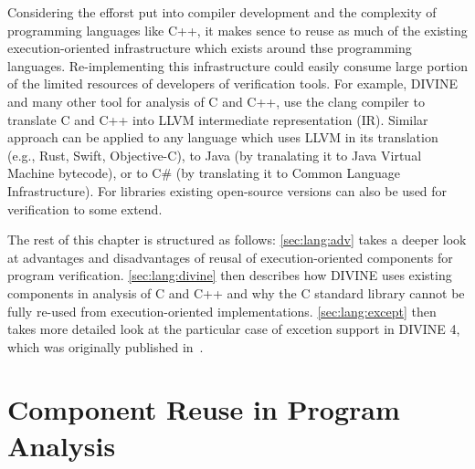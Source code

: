 Considering the efforst put into compiler development and the complexity of
programming languages like C++, it makes sence to reuse as much of the existing
execution-oriented infrastructure which exists around thse programming
languages.
Re-implementing this infrastructure could easily consume large portion of the
limited resources of developers of verification tools.
For example, DIVINE and many other tool for analysis of C and C++, use the
clang compiler to translate C and C++ into LLVM intermediate representation
(IR).
Similar approach can be applied to any language which uses LLVM in its
translation (e.g., Rust, Swift, Objective-C), to Java (by tranalating it to
Java Virtual Machine bytecode), or to C\# (by translating it to Common Language
Infrastructure).
For libraries existing open-source versions can also be used for verification to some extend.

The rest of this chapter is structured as follows: \autoref{sec:lang:adv} takes a deeper look at advantages and disadvantages of reusal of execution-oriented components for program verification.
\autoref{sec:lang:divine} then describes how DIVINE uses existing components in analysis of C and C++ and why the C standard library cannot be fully re-used from execution-oriented implementations.
\autoref{sec:lang:except} then takes more detailed look at the particular case of excetion support in DIVINE 4, which was originally published in~.


\section{Component Reuse in Program Analysis}\label{sec:lang:adv}

